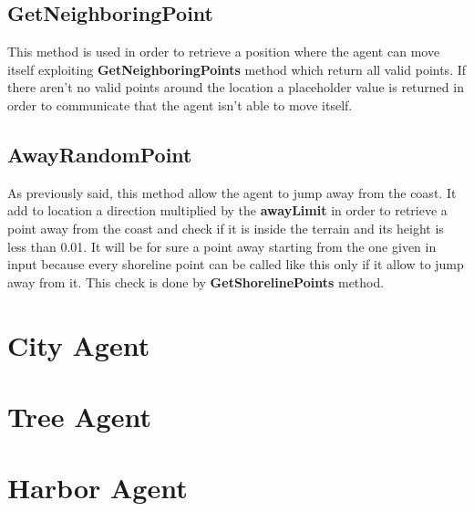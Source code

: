 \documentclass[12pt]{article}
\begin{document}
    \subsection{GetNeighboringPoint}
    This method is used in order to retrieve a position where the agent can move itself exploiting \textbf{GetNeighboringPoints} method which return all
    valid points. If there aren't no valid points around the location a placeholder value is returned in order to communicate that the agent isn't able
    to move itself.

    \subsection{AwayRandomPoint}
    As previously said, this method allow the agent to jump away from the coast. It add to location a direction multiplied by the \textbf{awayLimit} in order
    to retrieve a point away from the coast and check if it is inside the terrain and its height is less than 0.01. It will be for sure a point away starting
    from the one given in input because every shoreline point can be called like this only if it allow to jump away from it. This check is done by 
    \textbf{GetShorelinePoints} method.

    \section{City Agent}

    \section{Tree Agent}
 
    \section{Harbor Agent}
\end{document}

